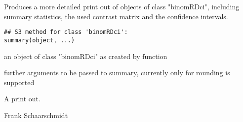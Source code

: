 \begin{Description}\relax
Produces a more detailed print out of objects of class "binomRDci", including summary statistics,
the used contrast matrix and the confidence intervals.
\end{Description}
\begin{Usage}
\begin{verbatim}
## S3 method for class 'binomRDci':
summary(object, ...)
\end{verbatim}
\end{Usage}
\begin{Arguments}
\begin{ldescription}
\item[\code{object}] an object of class "binomRDci" as created by function  
\item[\code{...}] further arguments to be passed to summary, currently only  for rounding is supported 
\end{ldescription}
\end{Arguments}
\begin{Value}
A print out.
\end{Value}
\begin{Author}\relax
Frank Schaarschmidt
\end{Author}

